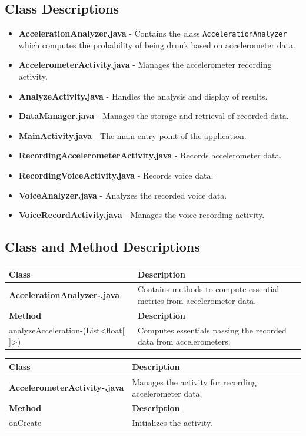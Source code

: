 \documentclass[12pt,a4paper]{article}
\begin{document}
\subsection{Class Descriptions}
\begin{itemize}
    \item \textbf{AccelerationAnalyzer.java} - Contains the class \texttt{AccelerationAnalyzer} which computes the probability of being drunk based on accelerometer data.
    \item \textbf{AccelerometerActivity.java} - Manages the accelerometer recording activity.
    \item \textbf{AnalyzeActivity.java} - Handles the analysis and display of results.
    \item \textbf{DataManager.java} - Manages the storage and retrieval of recorded data.
    \item \textbf{MainActivity.java} - The main entry point of the application.
    \item \textbf{RecordingAccelerometerActivity.java} - Records accelerometer data.
    \item \textbf{RecordingVoiceActivity.java} - Records voice data.
    \item \textbf{VoiceAnalyzer.java} - Analyzes the recorded voice data.
    \item \textbf{VoiceRecordActivity.java} - Manages the voice recording activity.
\end{itemize}

\subsection{Class and Method Descriptions}

\begin{longtable}{|p{5cm}|p{10cm}|}
\hline
\textbf{Class} & \textbf{Description} \\
\hline
\textbf{AccelerationAnalyzer-.java} & Contains methods to compute essential metrics from accelerometer data. \\
\hline
\textbf{Method} & \textbf{Description} \\
\hline
analyzeAcceleration-(List<float[ ]>) & Computes essentials passing the recorded data from accelerometers. \\
\hline
\end{longtable}

\begin{longtable}{|p{5cm}|p{10cm}|}
\hline
\textbf{Class} & \textbf{Description} \\
\hline
\textbf{AccelerometerActivity-.java} & Manages the activity for recording accelerometer data. \\
\hline
\textbf{Method} & \textbf{Description} \\
\hline
onCreate & Initializes the activity. \\
\hline
\end{longtable}
\end{document}

